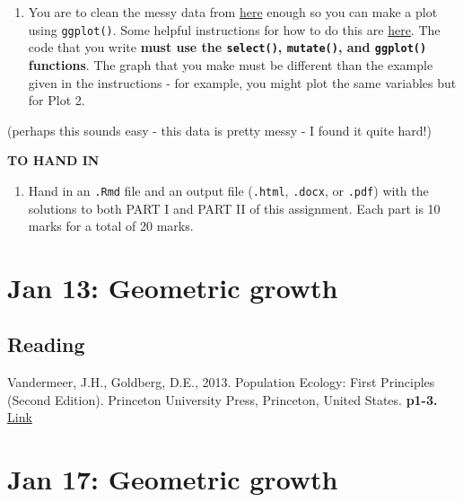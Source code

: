 \documentclass[
]{book}
\providecommand{\tightlist}{%
  \setlength{\itemsep}{0pt}\setlength{\parskip}{0pt}}
\begin{document}
\begin{enumerate}
\def\labelenumi{\arabic{enumi}.}
\tightlist
\item
  You are to clean the messy data from \href{https://datacarpentry.org/semester-biology/exercises/Tidy-data-improving-messy-data-SQL/}{here} enough so you can make a plot using \texttt{ggplot()}. Some helpful instructions for how to do this are \protect\hyperlink{partII}{here}. The code that you write \textbf{must use the \texttt{select()}, \texttt{mutate()}, and \texttt{ggplot()} functions}. The graph that you make must be different than the example given in the instructions - for example, you might plot the same variables but for Plot 2.
\end{enumerate}

(perhaps this sounds easy - this data is pretty messy - I found it quite hard!)

\textbf{TO HAND IN}

\begin{enumerate}
\def\labelenumi{\arabic{enumi}.}
\tightlist
\item
  Hand in an \texttt{.Rmd} file and an output file (\texttt{.html}, \texttt{.docx}, or \texttt{.pdf}) with the solutions to both PART I and PART II of this assignment. Each part is 10 marks for a total of 20 marks.
\end{enumerate}

\hypertarget{jan-13-geometric-growth}{%
\chapter{Jan 13: Geometric growth}\label{jan-13-geometric-growth}}

\hypertarget{reading}{%
\section{Reading}\label{reading}}

Vandermeer, J.H., Goldberg, D.E., 2013. Population Ecology: First Principles (Second Edition). Princeton University Press, Princeton, United States. \textbf{p1-3.} \href{https://ebookcentral-proquest-com.qe2a-proxy.mun.ca/lib/mun/detail.action?docID=1205619}{Link}

\hypertarget{jan-17-geometric-growth}{%
\chapter{Jan 17: Geometric growth}\label{jan-17-geometric-growth}}
\end{document}
